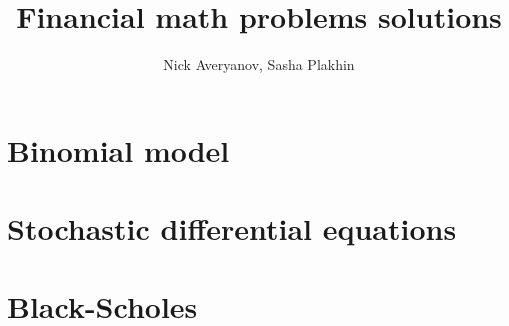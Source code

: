 \documentclass[a4paper, 12pt]{article}
\author{Nick Averyanov, Sasha Plakhin}
\title{Financial math problems solutions}
\begin{document}
\maketitle

\newpage
\tableofcontents{}

\newpage
\section{Binomial model}

\section{Stochastic differential equations}

\section{Black-Scholes}
\end{document}
